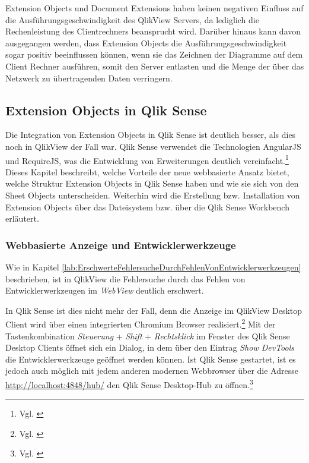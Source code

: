 Extension Objects und Document Extensions haben keinen negativen Einfluss auf die Ausführungs\-geschwindig\-keit des QlikView Servers, da lediglich die Rechenleistung des Clientrechners beansprucht wird. Darüber hinaus kann davon ausgegangen werden, dass Extension Objects die Ausführungs\-geschwindig\-keit sogar positiv beeinflussen können, wenn sie das Zeichnen der Diagramme auf dem Client Rechner ausführen, somit den Server entlasten und die Menge der über das Netzwerk zu übertragenden Daten verringern.










\subsection{Extension Objects in Qlik Sense}
Die Integration von Extension Objects in Qlik Sense ist deutlich besser, als dies noch in QlikView der Fall war. Qlik Sense verwendet die Technologien AngularJS und RequireJS, was die Entwicklung von Erweiterungen deutlich vereinfacht.\footnote{Vgl. \cite{ThirdPartySoftwareAttributionsCopyrightsLicensesAndDisclosure}} Dieses Kapitel beschreibt, welche Vorteile der neue webbasierte Ansatz bietet, welche Struktur Extension Objects in Qlik Sense haben und wie sie sich von den Sheet Objects unterscheiden. Weiterhin wird die Erstellung bzw. Installation von Extension Objects über das Datei\-system bzw. über die Qlik Sense Workbench erläutert.

\subsubsection{Webbasierte Anzeige und Entwicklerwerkzeuge}

Wie in Kapitel \ref{lab:ErschwerteFehlersucheDurchFehlenVonEntwicklerwerkzeugen} beschrieben, ist in QlikView die Fehler\-suche durch das Fehlen von Entwickler\-werkzeugen im \textit{WebView} deutlich erschwert.

In Qlik Sense ist dies nicht mehr der Fall, denn die Anzeige im QlikView Desktop Client wird über einen integrierten Chromium Browser realisiert.\footnote{Vgl. \cite[o. S.]{QlikSenseArchitecture}} Mit der Tasten\-kombination \textit{Steuerung} + \textit{Shift} + \textit{Rechtsklick} im Fenster des Qlik Sense Desktop Clients öffnet sich ein Dialog, in dem über den Eintrag \textit{Show DevTools} die Entwickler\-werkzeuge geöffnet werden können. Ist Qlik Sense gestartet, ist es jedoch auch möglich mit jedem anderen modernen Webbrowser über die Adresse \url{http://localhost:4848/hub/} den Qlik Sense Desktop-Hub zu öffnen.\footnote{Vgl. \cite[o. S.]{QlikSenseArchitecture}}


